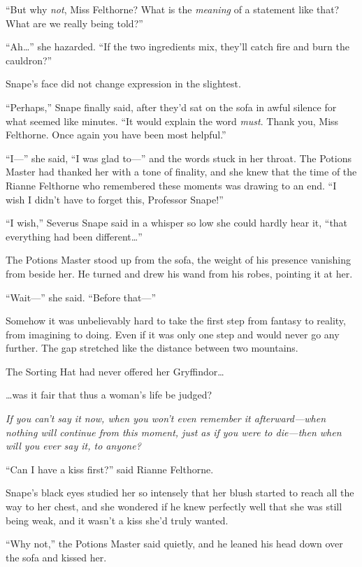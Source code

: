 ``But why \emph{not}, Miss Felthorne? What is the \emph{meaning} of a
statement like that? What are we really being told?''

``Ah\ldots{}'' she hazarded. ``If the two ingredients mix, they'll catch
fire and burn the cauldron?''

Snape's face did not change expression in the slightest.

``Perhaps,'' Snape finally said, after they'd sat on the sofa in awful
silence for what seemed like minutes. ``It would explain the word
\emph{must}. Thank you, Miss Felthorne. Once again you have been most
helpful.''

``I---'' she said, ``I was glad to---'' and the words stuck in her
throat. The Potions Master had thanked her with a tone of finality, and
she knew that the time of the Rianne Felthorne who remembered these
moments was drawing to an end. ``I wish I didn't have to forget this,
Professor Snape!''

``I wish,'' Severus Snape said in a whisper so low she could hardly hear
it, ``that everything had been different\ldots{}''

The Potions Master stood up from the sofa, the weight of his presence
vanishing from beside her. He turned and drew his wand from his robes,
pointing it at her.

``Wait---'' she said. ``Before that---''

Somehow it was unbelievably hard to take the first step from fantasy to
reality, from imagining to doing. Even if it was only one step and would
never go any further. The gap stretched like the distance between two
mountains.

The Sorting Hat had never offered her Gryffindor\ldots{}

\ldots{}was it fair that thus a woman's life be judged?

\emph{If you can't} \emph{say it now, when you won't even remember it
afterward---when nothing will continue from this moment, just as if you
were to die---then when will you ever say it, to anyone?}

``Can I have a kiss first?'' said Rianne Felthorne.

Snape's black eyes studied her so intensely that her blush started to
reach all the way to her chest, and she wondered if he knew perfectly
well that she was still being weak, and it wasn't a kiss she'd truly
wanted.

``Why not,'' the Potions Master said quietly, and he leaned his head
down over the sofa and kissed her.

